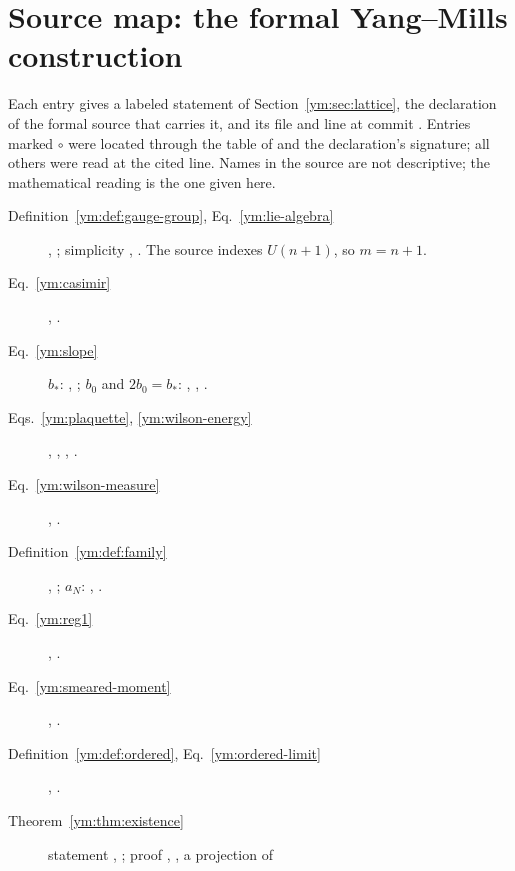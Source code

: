 \section{Source map: the formal Yang--Mills construction}\label{ym:sec:source-map}
Each entry gives a labeled statement of Section~\ref{ym:sec:lattice}, the
declaration of the formal source \cite{OpenAIYM2026} that carries it, and its
file and line at commit . Entries marked $\circ$ were located
through the table of \cite{Armstrong2026} and the declaration's signature;
all others were read at the cited line. Names in the source are not
descriptive; the mathematical reading is the one given here.

\begin{description}
\item[Definition~\ref{ym:def:gauge-group}, Eq.~\eqref{ym:lie-algebra}]
 , ;
 simplicity , .
 The source indexes $U(n+1)$, so $m=n+1$.
\item[Eq.~\eqref{ym:casimir}] ,
 .
\item[Eq.~\eqref{ym:slope}] $b_*$: ,
 ; $b_0$ and $2b_0=b_*$:
 , ,
 .
\item[Eqs.~\eqref{ym:plaquette}, \eqref{ym:wilson-energy}]
 , ,
 , .
\item[Eq.~\eqref{ym:wilson-measure}] ,
 .
\item[Definition~\ref{ym:def:family}] ,
 ; $a_N$: , .
\item[Eq.~\eqref{ym:reg1}] ,
 .
\item[Eq.~\eqref{ym:smeared-moment}] ,
 .
\item[Definition~\ref{ym:def:ordered}, Eq.~\eqref{ym:ordered-limit}]
 , .
\item[Theorem~\ref{ym:thm:existence}] statement
 , ; proof
 , , a projection of

\end{description}
